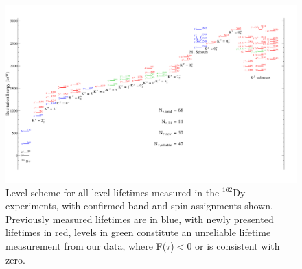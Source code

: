 \begin{landscape}
\begin{figure}[h!]
\begin{center}
\includegraphics[height=0.8\textheight]{162Dy_All.pdf}
\caption{Level scheme for all level lifetimes measured in the $^{162}$Dy experiments, with confirmed band and spin assignments shown. Previously measured lifetimes are in blue, with newly presented lifetimes in red, levels in green constitute an unreliable lifetime measurement from our data, where F($\tau$)$<$0 or is consistent with zero. 
\label{fig:162Dy_All}}
\end{center}
\end{figure}

\end{landscape}

